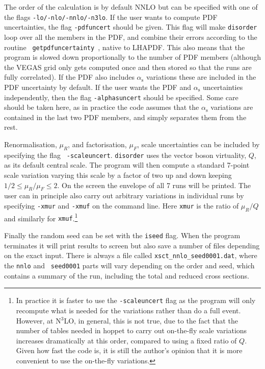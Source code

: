 \documentclass[submission, PhysCodeb]{SciPost}
\newcommand{\hoppet}{{\sc hoppet}}
\newcommand{\disorder}{{\tt disorder}}
\newcommand{\as}{\alpha_{\mathrm{s}}}
\newcommand{\NNNLO}{N$^3$LO}
\begin{document}
The order of the calculation is by default NNLO but can be specified
with one of the flags {\tt -lo/-nlo/-nnlo/-n3lo}. If the user wants to
compute PDF uncertainties, the flag {\tt -pdfuncert} should be
given. This flag will make \disorder{} loop over all the members in
the PDF, and combine their errors according to the routine {\tt
  getpdfuncertainty}~\cite{Watt:2011kp}, native to LHAPDF. This also
means that the program is slowed down proportionally to the number of
PDF members (although the VEGAS grid only gets computed once and then
stored so that the runs are fully correlated). If the PDF also
includes $\as$ variations these are included in the PDF uncertainty by
default. If the user wants the PDF and $\as$ uncertainties
independently, then the flag {\tt -alphasuncert} should be
specified. Some care should be taken here, as in practice the code
assumes that the $\as$ variations are contained in the last two PDF
members, and simply separates them from the rest.

Renormalisation, $\mu_R$, and factorisation, $\mu_F$, scale
uncertainties can be included by specifying the flag {\tt
  -scaleuncert}. \disorder{} uses the vector boson virtuality, $Q$, as
its default central scale. The program will then compute a standard
7-point scale variation varying this scale by a factor of two up and
down keeping $1/2\le \mu_R/\mu_F\le 2$. On the screen the envelope of
all 7 runs will be printed. The user can in principle also carry out
arbitrary variations in individual runs by specifying {\tt -xmur} and
{\tt -xmuf} on the command line. Here {\tt xmur} is the ratio of
$\mu_R/Q$ and similarly for {\tt xmuf}.\footnote{In practice it is
faster to use the {\tt -scaleuncert} flag as the program will only
recompute what is needed for the variations rather than do a full
event. However, at \NNNLO{}, in general, this is not true, due to the fact
that the number of tables needed in \hoppet{} to carry out on-the-fly
scale variations increases dramatically at this order, compared to
using a fixed ratio of $Q$. Given how fast the code is, it is still
the author's opinion that it is more convenient to use the on-the-fly
variations.}

Finally the random seed can be set with the {\tt iseed} flag. When the
program terminates it will print results to screen but also save a
number of files depending on the exact input. There is always a file
called {\tt xsct\_nnlo\_seed0001.dat}, where the {\tt nnlo} and {\tt
  seed0001} parts will vary depending on the order and seed, which
contains a summary of the run, including the total and reduced cross
sections. 
\end{document}
